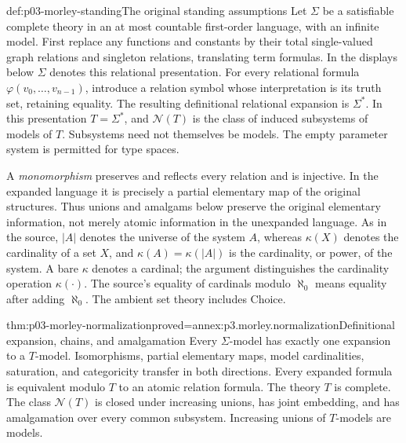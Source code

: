 \begin{hbconvention}{def:p03-morley-standing}{The original standing assumptions}
Let \(\Sigma\) be a satisfiable complete theory in an at most countable
first-order language, with an infinite model. First replace any
functions and constants by their total single-valued
graph relations and singleton relations, translating term formulas.
In the displays below \(\Sigma\) denotes this relational presentation.
For every relational formula
\(\varphi(v_0,\ldots,v_{n-1})\), introduce a relation symbol whose
interpretation is its truth set, retaining equality. The resulting
definitional relational expansion is \(\Sigma^*\). In this presentation
\(T=\Sigma^*\), and \(\mathcal N(T)\) is the class of induced
subsystems of models of \(T\). Subsystems need not themselves be models.
The empty parameter system is permitted for type spaces.

A \emph{monomorphism} preserves and reflects every relation and is
injective. In the expanded language it is precisely a partial elementary
map of the original structures. Thus unions and amalgams below preserve
the original elementary information, not merely atomic information in
the unexpanded language. As in the source, \(|A|\) denotes the
universe of the system \(A\), whereas \(\kappa(X)\) denotes the
cardinality of a set \(X\), and \(\kappa(A)=\kappa(|A|)\) is the
cardinality, or power, of the system. A bare \(\kappa\) denotes a
cardinal; the argument distinguishes the cardinality operation
\(\kappa(\cdot)\). The source's equality of cardinals modulo
\(\aleph_0\) means equality after adding \(\aleph_0\).
The ambient set theory includes Choice.
\end{hbconvention}

\begin{hbtheorem}{thm:p03-morley-normalization}{proved=annex:p3.morley.normalization}{Definitional expansion, chains, and amalgamation}
Every \(\Sigma\)-model has exactly one expansion to a \(T\)-model.
Isomorphisms, partial elementary maps, model cardinalities, saturation,
and categoricity transfer in both directions. Every expanded formula is
equivalent modulo \(T\) to an atomic relation formula.
The theory \(T\) is complete. The class \(\mathcal N(T)\) is closed
under increasing unions, has joint embedding, and has amalgamation over
every common subsystem. Increasing unions of \(T\)-models are models.
\end{hbtheorem}


